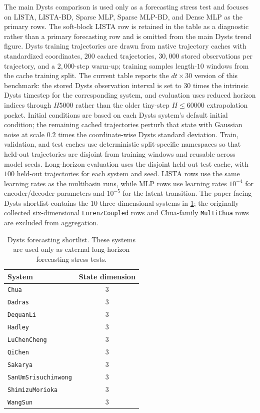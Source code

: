The main Dysts comparison is used only as a forecasting stress test and focuses on LISTA, LISTA-BD, Sparse MLP, Sparse MLP-BD, and Dense MLP as the primary rows. The soft-block LISTA row is retained in the table as a diagnostic rather than a primary forecasting row and is omitted from the main Dysts trend figure. Dysts training trajectories are drawn from native trajectory caches with standardized coordinates, $200$ cached trajectories, $30{,}000$ stored observations per trajectory, and a $2{,}000$-step warm-up; training samples length-$10$ windows from the cache training split. The current table reports the $dt{\times}30$ version of this benchmark: the stored Dysts observation interval is set to $30$ times the intrinsic Dysts timestep for the corresponding system, and evaluation uses reduced horizon indices through $H5000$ rather than the older tiny-step $H{\leq}60000$ extrapolation packet. Initial conditions are based on each Dysts system's default initial condition; the remaining cached trajectories perturb that state with Gaussian noise at scale $0.2$ times the coordinate-wise Dysts standard deviation. Train, validation, and test caches use deterministic split-specific namespaces so that held-out trajectories are disjoint from training windows and reusable across model seeds. Long-horizon evaluation uses the disjoint held-out test cache, with $100$ held-out trajectories for each system and seed. LISTA rows use the same learning rates as the multibasin runs, while MLP rows use learning rates $10^{-4}$ for encoder/decoder parameters and $10^{-5}$ for the latent transition. The paper-facing Dysts shortlist contains the \(10\) three-dimensional systems in \cref{tab:dysts_inventory}; the originally collected six-dimensional \texttt{LorenzCoupled} rows and Chua-family \texttt{MultiChua} rows are excluded from aggregation.

\begin{table}[tbp]
\centering
\caption{Dysts forecasting shortlist. These systems are used only as external long-horizon forecasting stress tests.}
\label{tab:dysts_inventory}
\begin{tabular}{@{}l c@{}}
\toprule
System & State dimension \\
\midrule
\texttt{Chua} & 3 \\
\texttt{Dadras} & 3 \\
\texttt{DequanLi} & 3 \\
\texttt{Hadley} & 3 \\
\texttt{LuChenCheng} & 3 \\
\texttt{QiChen} & 3 \\
\texttt{Sakarya} & 3 \\
\texttt{SanUmSrisuchinwong} & 3 \\
\texttt{ShimizuMorioka} & 3 \\
\texttt{WangSun} & 3 \\
\bottomrule
\end{tabular}
\end{table}

